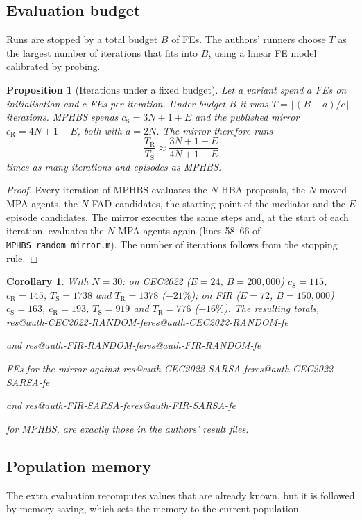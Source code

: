 \documentclass[11pt]{article}
\makeatletter
\newtheorem{proposition}{Proposition}
\newtheorem{corollary}{Corollary}
\theoremstyle{definition}
\theoremstyle{remark}
\renewcommand\res[1]{\ifcsname res@#1\endcsname\csname res@#1\endcsname\else\PackageError{res}{Undefined result key #1}{}\fi}
\makeatother
\begin{document}
\subsection{Evaluation budget}
Runs are stopped by a total budget $B$ of FEs. The authors' runners choose $T$ as the largest number of iterations that
fits into $B$, using a linear FE model calibrated by probing.

\begin{proposition}[Iterations under a fixed budget]
\label{prop:iter}
Let a variant spend $a$ FEs on initialisation and $c$ FEs per iteration. Under budget $B$ it runs
$T=\lfloor (B-a)/c\rfloor$ iterations. MPHBS spends $c_\mathrm{S}=3N+1+E$ and the published mirror
$c_\mathrm{R}=4N+1+E$, both with $a=2N$. The mirror therefore runs
\begin{equation}
\frac{T_\mathrm{R}}{T_\mathrm{S}} \approx \frac{3N+1+E}{4N+1+E}
\label{eq:ratio}
\end{equation}
times as many iterations and episodes as MPHBS.
\end{proposition}
\begin{proof}
Every iteration of MPHBS evaluates the $N$ HBA proposals, the $N$ moved MPA agents, the $N$ FAD candidates, the
starting point of the mediator and the $E$ episode candidates. The mirror executes the same steps and, at the start of
each iteration, evaluates the $N$ MPA agents again (lines 58--66 of \texttt{MPHBS\_random\_mirror.m}). The number of
iterations follows from the stopping rule.
\end{proof}

\begin{corollary}
\label{cor:deficit}
With $N=30$: on CEC2022 ($E=24$, $B=200{,}000$) $c_\mathrm{S}=115$, $c_\mathrm{R}=145$, $T_\mathrm{S}=1738$ and
$T_\mathrm{R}=1378$ ($-21\%$); on FIR ($E=72$, $B=150{,}000$) $c_\mathrm{S}=163$, $c_\mathrm{R}=193$, $T_\mathrm{S}=919$
and $T_\mathrm{R}=776$ ($-16\%$). The resulting totals, \res{auth-CEC2022-RANDOM-fe} and \res{auth-FIR-RANDOM-fe} FEs for
the mirror against \res{auth-CEC2022-SARSA-fe} and \res{auth-FIR-SARSA-fe} for MPHBS, are exactly those in the authors'
result files.
\end{corollary}

\subsection{Population memory}
The extra evaluation recomputes values that are already known, but it is followed by memory saving, which sets the
memory to the current population.
\end{document}
